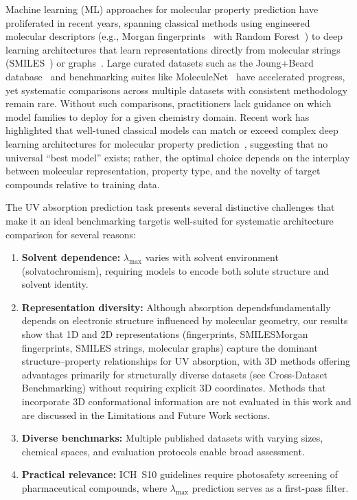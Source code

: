 \documentclass[journal=jcisd8,manuscript=article]{achemso}
\newcommand{\added}[1]{{\color{addedblue}#1}}
\newcommand{\removed}[1]{{\color{removedred}#1}}
\begin{document}
Machine learning (ML) approaches for molecular property prediction have proliferated in recent years, spanning classical methods using engineered molecular descriptors (e.g., Morgan fingerprints~\cite{rogers2010extended} with Random Forest~\cite{breiman2001random}) to deep learning architectures that learn representations directly from molecular strings (SMILES~\cite{weininger1988smiles}) or graphs~\cite{gilmer2017neural}.
Large curated datasets such as the Joung+Beard database~\cite{joung2020experimental, beard2019comparative} and benchmarking suites like MoleculeNet~\cite{wuMoleculeNet2018} have accelerated progress, yet systematic comparisons across multiple datasets with consistent methodology remain rare. Without such comparisons, practitioners lack guidance on which model families to deploy for a given chemistry domain.
Recent work has highlighted that well-tuned classical models can match or exceed complex deep learning architectures for molecular property prediction~\cite{panapitiya2022evaluation, walters2021applications, fooladi2025evaluating}, suggesting that no universal ``best model'' exists; rather, the optimal choice depends on the interplay between molecular representation, property type, and the novelty of target compounds relative to training data.

The UV absorption prediction task \removed{presents several distinctive challenges that make it an ideal benchmarking target}\added{is well-suited for systematic architecture comparison for several reasons}:
\begin{enumerate}
 \item \textbf{Solvent dependence:} $\lambda_{\max}$ varies with solvent environment (solvatochromism), requiring models to encode both solute structure and solvent identity.
 \item \textbf{Representation diversity:} Although absorption \removed{depends}\added{fundamentally depends} on electronic structure influenced by molecular geometry, our results show that 1D \added{and 2D} representations (\removed{fingerprints, SMILES}\added{Morgan fingerprints, SMILES strings, molecular graphs}) capture the dominant structure--property relationships for UV absorption\removed{, with 3D methods offering advantages primarily for structurally diverse datasets (see Cross-Dataset Benchmarking)}\added{ without requiring explicit 3D coordinates. Methods that incorporate 3D conformational information are not evaluated in this work and are discussed in the Limitations and Future Work sections}.
 \item \textbf{Diverse benchmarks:} Multiple published datasets with varying sizes, chemical spaces, and evaluation protocols enable broad assessment.
 \item \textbf{Practical relevance:} ICH~S10 guidelines require photosafety screening of pharmaceutical compounds, where $\lambda_{\max}$ prediction serves as a first-pass filter.
\end{enumerate}
\end{document}
